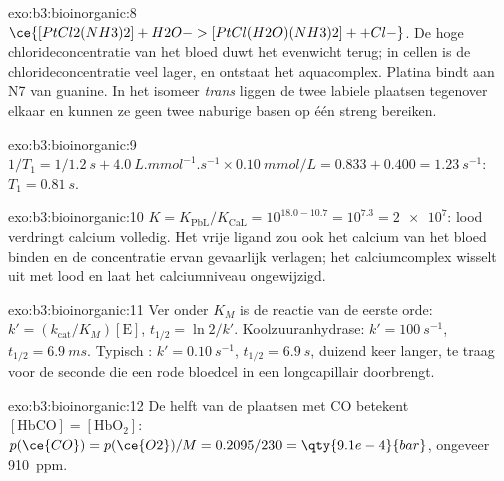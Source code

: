 \begin{solution}{exo:b3:bioinorganic:8}
$\ce{[PtCl2(NH3)2] + H2O -> [PtCl(H2O)(NH3)2]+ + Cl-}$. De hoge chlorideconcentratie van het bloed
duwt het evenwicht terug; in cellen is de chlorideconcentratie veel
lager, en ontstaat het aquacomplex. Platina bindt aan N7 van guanine. In
het isomeer \textit{trans} liggen de twee
labiele plaatsen tegenover elkaar en kunnen ze geen twee naburige basen
op één streng bereiken.
\end{solution}

\begin{solution}{exo:b3:bioinorganic:9}
$1/T_1 = 1/\qty{1.2}{s} + \qty{4.0}{L.mmol^{-1}.s^{-1}} \times \qty{0.10}{mmol/L} = 0.833 + 0.400 = \qty{1.23}{s^{-1}}$: $T_1 = \qty{0.81}{s}$.
\end{solution}

\begin{solution}{exo:b3:bioinorganic:10}
$K = K_{\mathrm{PbL}}/K_{\mathrm{CaL}} = 10^{18.0 - 10.7} = 10^{7.3} = \num{2e7}$: lood verdringt calcium volledig. Het vrije
ligand zou ook het calcium van het bloed binden en de concentratie ervan
gevaarlijk verlagen; het calciumcomplex wisselt uit met lood en laat het
calciumniveau ongewijzigd.
\end{solution}

\begin{solution}{exo:b3:bioinorganic:11}
Ver onder $K_M$ is de reactie van de eerste orde: $k' = (k_{\mathrm{cat}}/K_M)[\mathrm E]$, $t_{1/2} = \ln 2/k'$. Koolzuuranhydrase:
$k' = \qty{100}{s^{-1}}$, $t_{1/2} = \qty{6.9}{ms}$. Typisch : $k' = \qty{0.10}{s^{-1}}$, $t_{1/2} = \qty{6.9}{s}$, duizend
keer langer, te traag voor de seconde die een rode bloedcel in een
longcapillair doorbrengt.
\end{solution}

\begin{solution}{exo:b3:bioinorganic:12}
De helft van de plaatsen met CO betekent $[\mathrm{HbCO}] = [\mathrm{HbO_2}]$: $p(\ce{CO}) = p(\ce{O2})/M = 0.2095/230 = \qty{9.1e-4}{bar}$, ongeveer
\qty{910}{ppm}.
\end{solution}


